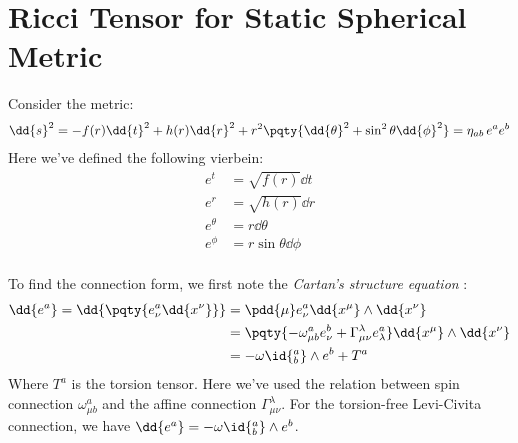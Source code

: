 \documentclass[a4paper,10pt]{article}
\begin{document}
\section{Ricci Tensor for Static Spherical Metric}
	Consider the metric:
	\begin{equation}
	\begin{aligned}
		\dd{s}^2
		= - f(r) \dd{t}^2
			+ h(r) \dd{r}^2
			+ r^2 \pqty{
				\dd{\theta}^2
				+ \sin^2\theta \dd{\phi}^2
			}
		= \eta_{ab}\, e^a e^b
	\end{aligned}
	\end{equation}
	Here we've defined the following vierbein:
	\begin{equation}
	\begin{aligned}
		e^t &= \sqrt{f(r)} \dd{t} \\
		e^r &= \sqrt{h(r)} \dd{r} \\
		e^\theta &= r \dd{\theta} \\
		e^\phi   &= r \sin\theta \dd{\phi} \\
	\end{aligned}
	\end{equation}
	
	To find the connection form, we first note the \textit{Cartan's structure equation} \cite{Carroll:1997ar}:
	\begin{equation}
	\begin{aligned}
		\dd{e^a}
		= \dd{\pqty{e^a_\nu \dd{x^\nu}}}
		&= \pdd{\mu} e^a_\nu
			\dd{x^\mu} \wedge \dd{x^\nu} \\
		&= \pqty{
				- \omega^{a}_{\mu b} e^b_\nu
				+ \Gamma^{\lambda}_{\mu\nu} e^a_\lambda
			}
			\dd{x^\mu} \wedge \dd{x^\nu} \\
		&= -\omega\id{^a_b} \wedge e^b
			+ T^a
	\end{aligned}
	\end{equation}
	Where $T^a$ is the torsion tensor. 
	Here we've used the relation between spin connection $\omega^a_{\mu b}$ and the affine connection $\Gamma^\lambda_{\mu\nu}$. For the torsion-free Levi-Civita connection, we have $
		\dd{e^a}
		= -\omega\id{^a_b} \wedge e^b
	$. 
	
\end{document}

